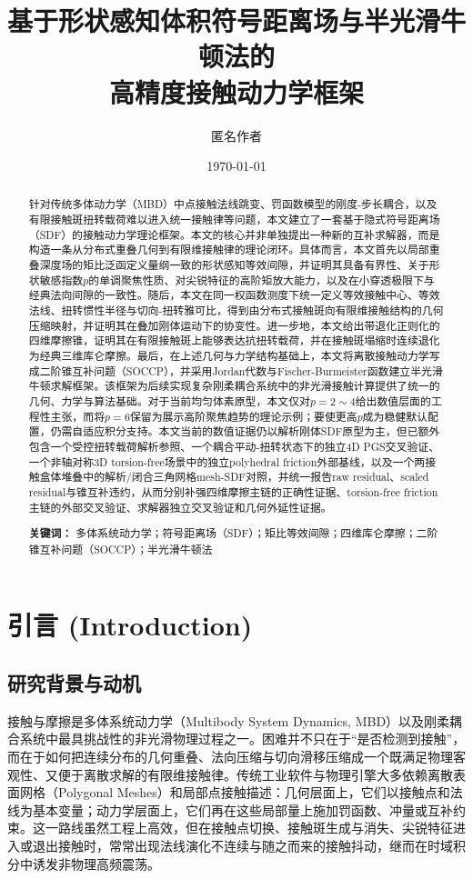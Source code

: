 ﻿\documentclass[12pt, a4paper]{ctexart}
\title{\textbf{基于形状感知体积符号距离场与半光滑牛顿法的\\高精度接触动力学框架}}
\author{匿名作者}
\date{\today}
\theoremstyle{plain}
\theoremstyle{remark}
\begin{document}
\maketitle

\begin{abstract}
针对传统多体动力学（MBD）中点接触法线跳变、罚函数模型的刚度-步长耦合，以及有限接触斑扭转载荷难以进入统一接触律等问题，本文建立了一套基于隐式符号距离场（SDF）的接触动力学理论框架。本文的核心并非单独提出一种新的互补求解器，而是构造一条从分布式重叠几何到有限维接触律的理论闭环。具体而言，本文首先以局部重叠深度场的矩比泛函定义量纲一致的形状感知等效间隙，并证明其具备有界性、关于形状敏感指数$p$的单调聚焦性质、对尖锐特征的高阶矩放大能力，以及在小穿透极限下与经典法向间隙的一致性。随后，本文在同一权函数测度下统一定义等效接触中心、等效法线、扭转惯性半径与切向-扭转雅可比，得到由分布式接触斑向有限维接触结构的几何压缩映射，并证明其在叠加刚体运动下的协变性。进一步地，本文给出带退化正则化的四维摩擦锥，证明其在有限接触斑上能够表达抗扭转载荷，并在接触斑塌缩时连续退化为经典三维库仑摩擦。最后，在上述几何与力学结构基础上，本文将离散接触动力学写成二阶锥互补问题（SOCCP），并采用Jordan代数与Fischer-Burmeister函数建立半光滑牛顿求解框架。该框架为后续实现复杂刚柔耦合系统中的非光滑接触计算提供了统一的几何、力学与算法基础。对于当前均匀体素原型，本文仅对$p=2\sim4$给出数值层面的工程性主张，而将$p=6$保留为展示高阶聚焦趋势的理论示例；要使更高$p$成为稳健默认配置，仍需自适应积分支持。本文当前的数值证据仍以解析刚体SDF原型为主，但已额外包含一个受控扭转载荷解析参照、一个耦合平动-扭转状态下的独立4D PGS交叉验证、一个非轴对称3D torsion-free场景中的独立polyhedral friction外部基线，以及一个两接触盒体堆叠中的解析/闭合三角网格mesh-SDF对照，并统一报告raw residual、scaled residual与锥互补违约，从而分别补强四维摩擦主链的正确性证据、torsion-free friction主链的外部交叉验证、求解器独立交叉验证和几何外延性证据。

\textbf{关键词：} 多体系统动力学；符号距离场（SDF）；矩比等效间隙；四维库仑摩擦；二阶锥互补问题（SOCCP）；半光滑牛顿法
\end{abstract}

\newpage
\tableofcontents
\newpage

\section{引言 (Introduction)}
\subsection{研究背景与动机}
接触与摩擦是多体系统动力学（Multibody System Dynamics, MBD）以及刚柔耦合系统中最具挑战性的非光滑物理过程之一。困难并不只在于“是否检测到接触”，而在于如何把连续分布的几何重叠、法向压缩与切向滑移压缩成一个既满足物理客观性、又便于离散求解的有限维接触律。传统工业软件与物理引擎大多依赖离散表面网格（Polygonal Meshes）和局部点接触描述：几何层面上，它们以接触点和法线为基本变量；动力学层面上，它们再在这些局部量上施加罚函数、冲量或互补约束。这一路线虽然工程上高效，但在接触点切换、接触斑生成与消失、尖锐特征进入或退出接触时，常常出现法线演化不连续与随之而来的接触抖动，继而在时域积分中诱发非物理高频震荡\cite{lu2011isogeometric,noels2006crashworthiness}。
\end{document}
